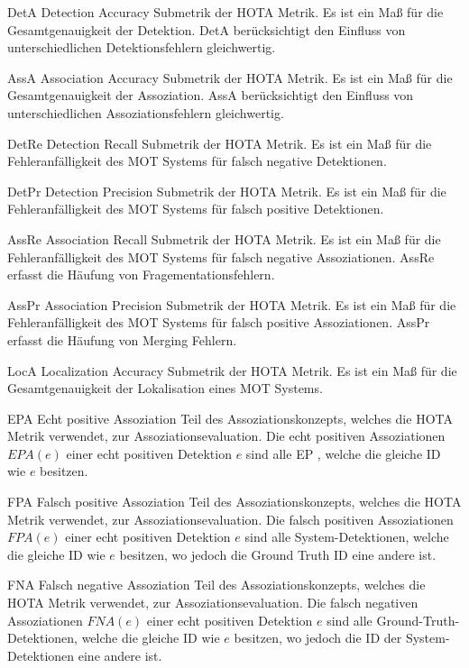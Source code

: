 \newglossaryentrywithacronym
{DetA}
{Detection Accuracy}
{Submetrik der HOTA Metrik. Es ist ein Maß für die Gesamtgenauigkeit der Detektion. DetA berücksichtigt den Einfluss von unterschiedlichen Detektionsfehlern gleichwertig.}

\newglossaryentrywithacronym
{AssA}
{Association Accuracy}
{Submetrik der HOTA Metrik. Es ist ein Maß für die Gesamtgenauigkeit der Assoziation. AssA berücksichtigt den Einfluss von unterschiedlichen Assoziationsfehlern gleichwertig.}

\newglossaryentrywithacronym
{DetRe}
{Detection Recall}
{Submetrik der HOTA Metrik. Es ist ein Maß für die Fehleranfälligkeit des MOT Systems für falsch negative Detektionen.}

\newglossaryentrywithacronym
{DetPr}
{Detection Precision}
{Submetrik der HOTA Metrik. Es ist ein Maß für die Fehleranfälligkeit des MOT Systems für falsch positive Detektionen.}

\newglossaryentrywithacronym
{AssRe}
{Association Recall}
{Submetrik der HOTA Metrik. Es ist ein Maß für die Fehleranfälligkeit des MOT Systems für falsch negative Assoziationen. AssRe erfasst die Häufung von Fragementationsfehlern.}

\newglossaryentrywithacronym
{AssPr}
{Association Precision}
{Submetrik der HOTA Metrik. Es ist ein Maß für die Fehleranfälligkeit des MOT Systems für falsch positive Assoziationen. AssPr erfasst die Häufung von Merging Fehlern.}

\newglossaryentrywithacronym
{LocA}
{Localization Accuracy}
{Submetrik der HOTA Metrik. Es ist ein Maß für die Gesamtgenauigkeit der Lokalisation eines MOT Systems.}

\newglossaryentrywithacronym
{EPA}
{Echt positive Assoziation}
{Teil des Assoziationskonzepts, welches die HOTA Metrik verwendet, zur Assoziationsevaluation. Die echt positiven Assoziationen \(EPA(e)\) einer echt positiven Detektion \(e\) sind alle EP , welche die gleiche ID wie \(e\) besitzen.}

\newglossaryentrywithacronym
{FPA}
{Falsch positive Assoziation}
{Teil des Assoziationskonzepts, welches die HOTA Metrik verwendet, zur Assoziationsevaluation. Die falsch positiven Assoziationen \(FPA(e)\) einer echt positiven Detektion \(e\) sind alle System-Detektionen, welche die gleiche ID wie \(e\) besitzen, wo jedoch die Ground Truth ID eine andere ist.}

\newglossaryentrywithacronym
{FNA}
{Falsch negative Assoziation}
{Teil des Assoziationskonzepts, welches die HOTA Metrik verwendet, zur Assoziationsevaluation. Die falsch negativen Assoziationen \(FNA(e)\) einer echt positiven Detektion \(e\) sind alle  Ground-Truth-Detektionen, welche die gleiche ID wie \(e\) besitzen, wo jedoch die ID der System-Detektionen eine andere ist.}

